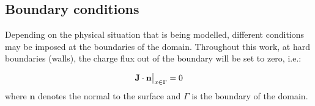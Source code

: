 \subsection{Boundary conditions}
Depending on the physical situation that is being modelled, different
conditions may be imposed at the boundaries of the domain. Throughout
this work, at hard boundaries (walls), the charge flux out of the
boundary will be set to zero, i.e.:

\begin{equation}
\mathbf{J} \cdot \mathbf{n}\big|_{x \in \Gamma} = 0 
\end{equation}
where $\mathbf{n}$ denotes the normal to the surface and $\Gamma$ is
the boundary of the domain. 





